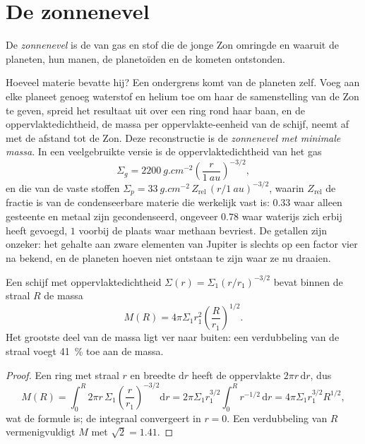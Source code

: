 \section{De zonnenevel}

\begin{definition}[Zonnenevel]\label{def:b2:planet-formation-meteorites:nebula}
De \emph{zonnenevel} is de  van gas
en stof die de jonge Zon omringde en waaruit de planeten, hun
manen, de planetoïden en de kometen ontstonden.
\end{definition}

Hoeveel materie bevatte hij? Een ondergrens komt van de planeten zelf.
Voeg aan elke planeet genoeg waterstof en helium toe om haar de samenstelling van de
Zon te geven, spreid het resultaat uit over een ring rond haar baan, en de
oppervlaktedichtheid, de massa per oppervlakte-eenheid van de schijf, neemt af met de afstand tot
de Zon. Deze reconstructie is de \emph{zonnenevel met minimale
massa}. In een veelgebruikte versie is de
oppervlaktedichtheid van het gas
\[
  \Sigma_g = \qty{2200}{g.cm^{-2}}\left(\frac{r}{\qty{1}{au}}\right)^{-3/2},
\]
en die van de vaste stoffen $\Sigma_p = \qty{33}{g.cm^{-2}}\,Z_{\mathrm{rel}}\,
(r/\qty{1}{au})^{-3/2}$, waarin $Z_{\mathrm{rel}}$ de fractie is van de
condenseerbare materie die werkelijk vast is: $0.33$ waar alleen gesteente en metaal zijn
gecondenseerd, ongeveer $0.78$ waar waterijs zich erbij heeft gevoegd, $1$ voorbij de plaats
waar methaan bevriest. De getallen zijn onzeker: het gehalte aan zware elementen van
Jupiter is slechts op een factor vier na bekend, en de planeten hoeven niet
ontstaan te zijn waar ze nu draaien.

\begin{proposition}\label{prop:b2:planet-formation-meteorites:disc-mass}
Een schijf met oppervlaktedichtheid $\Sigma(r) = \Sigma_1 (r/r_1)^{-3/2}$ bevat binnen
de straal $R$ de massa
\[
  M(R) = 4\pi\Sigma_1 r_1^2 \left(\frac{R}{r_1}\right)^{1/2}.
\]
Het grootste deel van de massa ligt ver naar buiten: een verdubbeling van de straal voegt \qty{41}{\percent} toe aan
de massa.
\end{proposition}

\begin{proof}
Een ring met straal $r$ en breedte $\mathrm dr$ heeft de oppervlakte $2\pi r\,\mathrm dr$, dus
\[
  M(R) = \int_0^R 2\pi r\,\Sigma_1 \left(\frac{r}{r_1}\right)^{-3/2}\mathrm dr
       = 2\pi\Sigma_1 r_1^{3/2}\int_0^R r^{-1/2}\,\mathrm dr
       = 4\pi\Sigma_1 r_1^{3/2} R^{1/2},
\]
wat de formule is; de integraal convergeert in $r = 0$. Een verdubbeling van $R$
vermenigvuldigt $M$ met $\sqrt 2 = 1.41$.
\end{proof}

